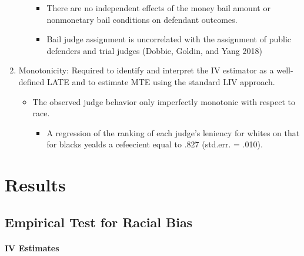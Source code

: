 \documentclass[../root]{subfiles}
\begin{document}
\begin{enumerate}
\begin{itemize}
\begin{itemize}
          \item There are no independent effects of the money bail amount or nonmonetary bail conditions on defendant outcomes.
          \item Bail judge assignment is uncorrelated with the assignment of public defenders and trial judges (Dobbie, Goldin, and Yang 2018)
        \end{itemize}
      \end{itemize}
      \item Monotonicity: Required to identify and interpret the IV estimator as a well-defined LATE and to estimate MTE using the standard LIV approach.
      \begin{itemize}
        \item The observed judge behavior only imperfectly monotonic with respect to race.
        \begin{itemize}
          \item A regression of the ranking of each judge's leniency for whites on that for blacks yealds a cefeecient equal to .827 (std.err. = .010).
        \end{itemize}
      \end{itemize}
    \end{enumerate}

    \section{Results}

    \subsection{Empirical Test for Racial Bias}

    \paragraph{IV Estimates}
\end{document}

